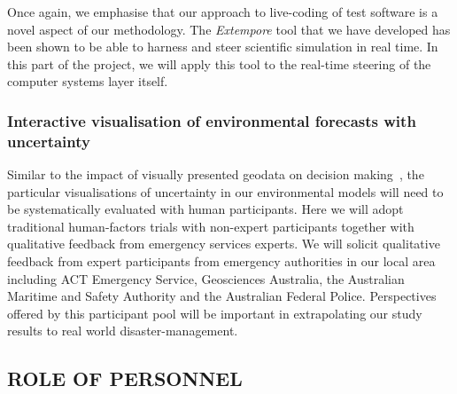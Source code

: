 \documentclass[a4paper,fontsize=12pt]{scrartcl}
\begin{document}
Once again, we emphasise that our approach to live-coding of test
software is a novel aspect of our methodology. The \emph{Extempore}
tool that we have developed has been shown to be able to harness and
steer scientific simulation in real time. In this part of the project,
we will apply this tool to the real-time steering of the computer
systems layer itself.


\subsubsection*{Interactive visualisation of environmental forecasts with uncertainty}

Similar to the impact of visually presented geodata on decision
making~\parencite{kinkeldey2015evaluating}, the particular
visualisations of uncertainty in our environmental models will need to
be systematically evaluated with human participants. Here we will
adopt traditional human-factors trials with non-expert participants
together with qualitative feedback from emergency services experts. We
will solicit qualitative feedback from expert participants from
emergency authorities in our local area including ACT Emergency
Service, Geosciences Australia, the Australian Maritime and Safety
Authority and the Australian Federal Police. Perspectives offered by
this participant pool will be important in extrapolating our study
results to real world disaster-management.




\subsection*{ROLE OF PERSONNEL}

%
\end{document}
